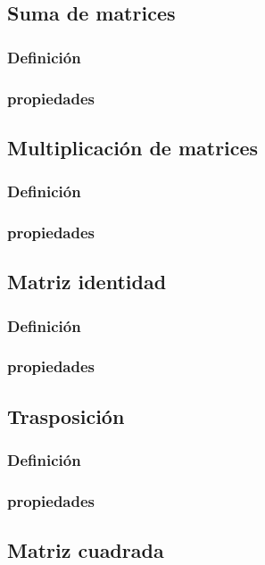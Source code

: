 \documentclass{article}
\begin{document}
\subsection{Suma de matrices}
\subsubsection{Definición}
\subsubsection{propiedades}

\subsection{Multiplicación de matrices}
\subsubsection{Definición}
\subsubsection{propiedades}

\subsection{Matriz identidad}
\subsubsection{Definición}
\subsubsection{propiedades}

\subsection{Trasposición}
\subsubsection{Definición}
\subsubsection{propiedades}

\subsection{Matriz cuadrada}
\end{document}
